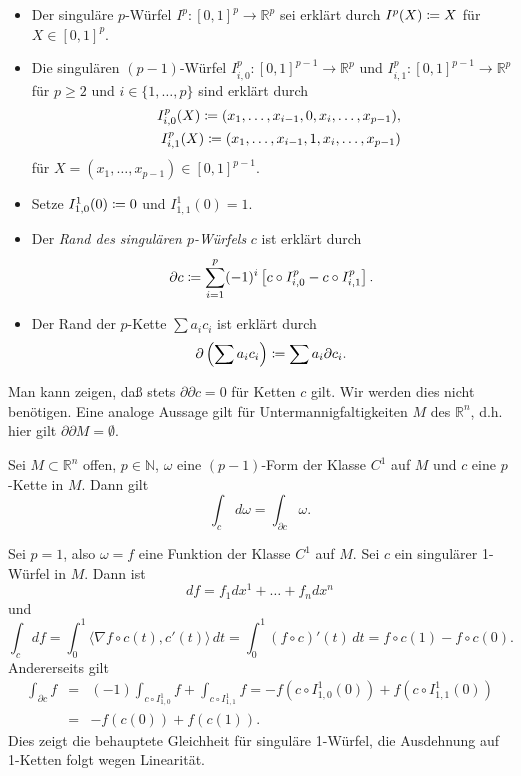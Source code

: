 \documentclass[a4paper,twoside,DIV15,BCOR12mm]{scrbook}
\begin{document}
 \begin{itemize}
\item Der singuläre $p$-Würfel $I^{p}: 
[0,1]^{p} \to {\mathbb R}^{p}$ sei erklärt durch $I^{p}(X) \da  X$ 
für $X \in [0,1]^{p}$. 
\item Die singulären $(p-1)$-Würfel $I_{i,0}^{p}: 
[0,1]^{p-1} \to {\mathbb R}^{p}$ und $I_{i,1}^{p}: [0,1]^{p-1} \to 
{\mathbb R}^{p}$ für $p \ge 2$ und $i \in \{1,\dots,p\}$ sind 
erklärt durch
\begin{eqnarray*}
&   & I_{i,0}^{p}(X) \da  (x_{1},\dots,x_{i-1},0,x_{i},\dots,x_{p-1}), 
\\
&   & I_{i,1}^{p}(X) \da  (x_{1},\dots,x_{i-1},1,x_{i},\dots,x_{p-1}) 
\end{eqnarray*}
für $X = (x_{1},\dots,x_{p-1}) \in [0,1]^{p-1}$. 
\item Setze 
$I_{1,0}^{1}(0) \da  0$ und $I_{1,1}^{1}(0) = 1$. 
\item Der {\em Rand des 
singulären $p$-Würfels} $c$ ist erklärt durch
\[ \partial c \da  \sum_{i=1}^{p} (-1)^{i} \left[ c \circ I_{i,0}^{p} - 
c \circ I_{i,1}^{p}\right]. \]
\item Der Rand der $p$-Kette $\sum a_{i}c_{i}$ ist erklärt durch
\[ \partial\left(\sum a_{i}c_{i}\right) \da  \sum a_{i}\partial c_{i}. \]
\end{itemize}
Man kann zeigen, daß stets $\partial \partial c = 0$ für Ketten $c$ 
gilt. Wir werden dies nicht benötigen. Eine analoge Aussage gilt 
für Untermannigfaltigkeiten $M$ des ${\mathbb R}^{n}$, d.h. hier 
gilt $\partial \partial M = \emptyset$.

\bigskip

\begin{satz}\label{Satz3.5.1}  {Sei $M \subset 
{\mathbb R}^{n}$ offen, $p \in {\mathbb N}$, $\omega$ eine 
$(p-1)$-Form der Klasse $C^{1}$ auf $M$ und $c$ eine $p$-Kette in 
$M$. Dann gilt}
\[ \int_{c} \, d\omega = \int_{\partial c} \omega. \]
\end{satz}

\bigskip

 Sei $p = 1$, also $\omega = f$ eine Funktion 
der Klasse $C^{1}$ auf $M$. Sei $c$ ein singulärer 1-Würfel in $M$. 
Dann ist
\[ df = f_{1} dx^{1} + \dots + f_{n}dx^{n} \]
und
\[
\int_{c} df  =  \int_{0}^{1} \langle \nabla f \circ c(t), 
c'(t) \rangle \, dt = \int_{0}^{1}(f \circ c)'(t)\, dt 
 =  f \circ c(1) - f \circ c(0).
\]
Andererseits gilt
\begin{eqnarray*}
\int_{\partial c} f & = & (-1) \int_{c \circ I_{1,0}^{1}} f + 
\int_{c \circ I_{1,1}^{1}} f 
 =  -f(c \circ I_{1,0}^{1}(0)) + f(c \circ I_{1,1}^{1}(0)) \\
& = & -f(c(0)) + f(c(1)). 
\end{eqnarray*}
Dies zeigt die behauptete Gleichheit für singuläre 1-Würfel, die 
Ausdehnung auf 1-Ketten folgt wegen Linearität.\\
\end{document}
